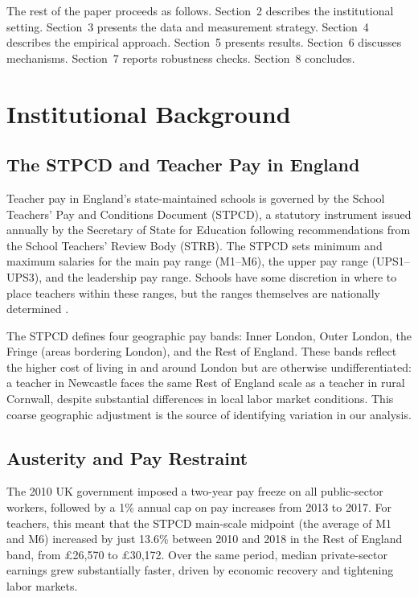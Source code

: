 \documentclass[12pt]{article}
\begin{document}
The rest of the paper proceeds as follows. Section~2 describes the institutional setting. Section~3 presents the data and measurement strategy. Section~4 describes the empirical approach. Section~5 presents results. Section~6 discusses mechanisms. Section~7 reports robustness checks. Section~8 concludes.


\section{Institutional Background}

\subsection{The STPCD and Teacher Pay in England}

Teacher pay in England's state-maintained schools is governed by the School Teachers' Pay and Conditions Document (STPCD), a statutory instrument issued annually by the Secretary of State for Education following recommendations from the School Teachers' Review Body (STRB). The STPCD sets minimum and maximum salaries for the main pay range (M1--M6), the upper pay range (UPS1--UPS3), and the leadership pay range. Schools have some discretion in where to place teachers within these ranges, but the ranges themselves are nationally determined \citep{strb2023report}.

The STPCD defines four geographic pay bands: Inner London, Outer London, the Fringe (areas bordering London), and the Rest of England. These bands reflect the higher cost of living in and around London but are otherwise undifferentiated: a teacher in Newcastle faces the same Rest of England scale as a teacher in rural Cornwall, despite substantial differences in local labor market conditions. This coarse geographic adjustment is the source of identifying variation in our analysis.

\subsection{Austerity and Pay Restraint}

The 2010 UK government imposed a two-year pay freeze on all public-sector workers, followed by a 1\% annual cap on pay increases from 2013 to 2017. For teachers, this meant that the STPCD main-scale midpoint (the average of M1 and M6) increased by just 13.6\% between 2010 and 2018 in the Rest of England band, from \pounds26,570 to \pounds30,172. Over the same period, median private-sector earnings grew substantially faster, driven by economic recovery and tightening labor markets.
\end{document}
